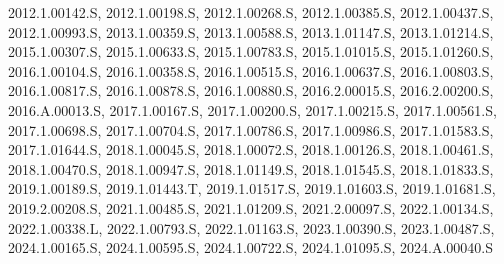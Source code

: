 \mbox{2012.1.00142.S}, \mbox{2012.1.00198.S}, \mbox{2012.1.00268.S}, \mbox{2012.1.00385.S}, \mbox{2012.1.00437.S}, \mbox{2012.1.00993.S}, \mbox{2013.1.00359.S}, \mbox{2013.1.00588.S}, \mbox{2013.1.01147.S}, \mbox{2013.1.01214.S}, \mbox{2015.1.00307.S}, \mbox{2015.1.00633.S}, \mbox{2015.1.00783.S}, \mbox{2015.1.01015.S}, \mbox{2015.1.01260.S}, \mbox{2016.1.00104.S}, \mbox{2016.1.00358.S}, \mbox{2016.1.00515.S}, \mbox{2016.1.00637.S}, \mbox{2016.1.00803.S}, \mbox{2016.1.00817.S}, \mbox{2016.1.00878.S}, \mbox{2016.1.00880.S}, \mbox{2016.2.00015.S}, \mbox{2016.2.00200.S}, \mbox{2016.A.00013.S}, \mbox{2017.1.00167.S}, \mbox{2017.1.00200.S}, \mbox{2017.1.00215.S}, \mbox{2017.1.00561.S}, \mbox{2017.1.00698.S}, \mbox{2017.1.00704.S}, \mbox{2017.1.00786.S}, \mbox{2017.1.00986.S}, \mbox{2017.1.01583.S}, \mbox{2017.1.01644.S}, \mbox{2018.1.00045.S}, \mbox{2018.1.00072.S}, \mbox{2018.1.00126.S}, \mbox{2018.1.00461.S}, \mbox{2018.1.00470.S}, \mbox{2018.1.00947.S}, \mbox{2018.1.01149.S}, \mbox{2018.1.01545.S}, \mbox{2018.1.01833.S}, \mbox{2019.1.00189.S}, \mbox{2019.1.01443.T}, \mbox{2019.1.01517.S}, \mbox{2019.1.01603.S}, \mbox{2019.1.01681.S}, \mbox{2019.2.00208.S}, \mbox{2021.1.00485.S}, \mbox{2021.1.01209.S}, \mbox{2021.2.00097.S}, \mbox{2022.1.00134.S}, \mbox{2022.1.00338.L}, \mbox{2022.1.00793.S}, \mbox{2022.1.01163.S}, \mbox{2023.1.00390.S}, \mbox{2023.1.00487.S}, \mbox{2024.1.00165.S}, \mbox{2024.1.00595.S}, \mbox{2024.1.00722.S}, \mbox{2024.1.01095.S}, \mbox{2024.A.00040.S}
